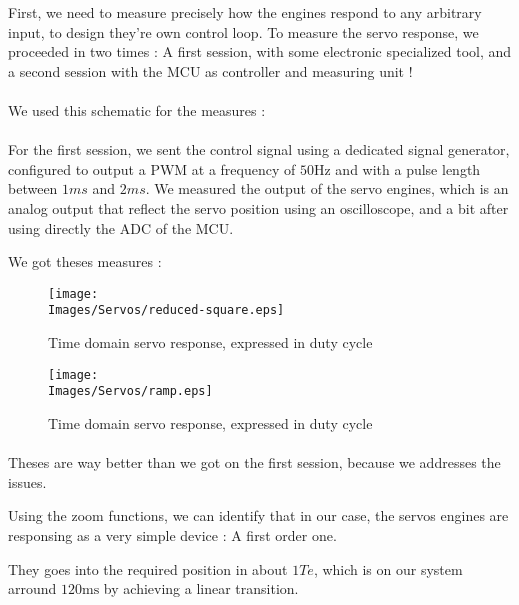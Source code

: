 First, we need to measure precisely how the engines respond to any arbitrary input, to design they're own control loop.
To measure the servo response, we proceeded in two times : A first session, with some electronic specialized tool,
and a second session with the MCU as controller and measuring unit !

\paragraph{}
We used this schematic for the measures :


\paragraph{}
For the first session, we sent the control signal using a dedicated signal generator, configured
to output a PWM at a frequency of $50 \si{\hertz}$ and with a pulse length between $1 \si{ms}$ and
$2 \si{ms}$.
We measured the output of the servo engines, which is an analog output that reflect the servo position
using an oscilloscope, and a bit after using directly the ADC of the MCU.

We got theses measures :

\begin{figure}[!hbt]
    \centering
    \begin{minipage}[c]{0.48\textwidth}
        \centering
        \texttt{[image: \\Images/Servos/reduced-square.eps]}
        \caption{Time domain servo response, expressed in duty cycle}\label{img:servo_square}
    \end{minipage}%
    \hfill%
    \begin{minipage}[c]{0.48\textwidth}
        \centering
        \texttt{[image: \\Images/Servos/ramp.eps]}
        \caption{Time domain servo response, expressed in duty cycle}\label{img:servo_ramp}
    \end{minipage}%
\end{figure}
\FloatBarrier

\paragraph{}
Theses are way better than we got on the first session, because we addresses the issues.

Using the zoom functions, we can identify that in our case, the servos engines are responsing
as a very simple device : A first order one.

They goes into the required position in about $1 Te$, which is on our system arround
$120 \si{\milli\second}$ by achieving a linear transition.

